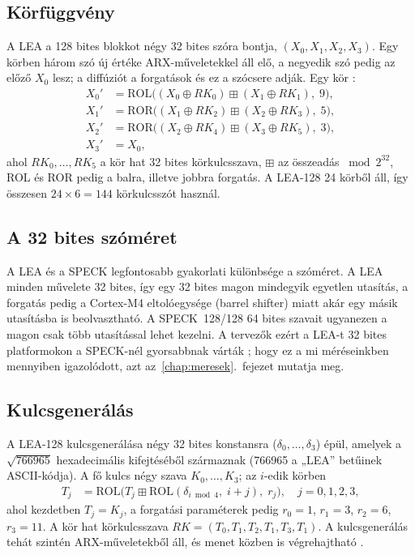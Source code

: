 \documentclass[a4paper,12pt]{report}
\theoremstyle{definition}
\theoremstyle{remark}
\begin{document}
\subsection{Körfüggvény}\label{sec:lea_kor}

A LEA a 128 bites blokkot négy 32 bites szóra bontja, $(X_0, X_1, X_2, X_3)$. Egy körben három szó új értéke ARX-műveletekkel áll elő, a negyedik szó pedig az előző $X_0$ lesz; a diffúziót a forgatások és ez a szócsere adják. Egy kör \cite{Hong2013}:
\begin{align}
X_0' &= \text{ROL}\big((X_0 \oplus RK_0) \mathbin{\boxplus} (X_1 \oplus RK_1),\; 9\big), \\
X_1' &= \text{ROR}\big((X_1 \oplus RK_2) \mathbin{\boxplus} (X_2 \oplus RK_3),\; 5\big), \\
X_2' &= \text{ROR}\big((X_2 \oplus RK_4) \mathbin{\boxplus} (X_3 \oplus RK_5),\; 3\big), \\
X_3' &= X_0,
\end{align}
ahol $RK_0, \ldots, RK_5$ a kör hat 32 bites körkulcsszava, $\boxplus$ az összeadás $\bmod 2^{32}$, ROL és ROR pedig a balra, illetve jobbra forgatás. A LEA-128 24 körből áll, így összesen $24 \times 6 = 144$ körkulcsszót használ.

\subsection{A 32 bites szóméret}

A LEA és a SPECK legfontosabb gyakorlati különbsége a szóméret. A LEA minden művelete 32 bites, így egy 32 bites magon mindegyik egyetlen utasítás, a forgatás pedig a Cortex-M4 eltolóegysége (barrel shifter) miatt akár egy másik utasításba is beolvasztható. A SPECK~128/128 64 bites szavait ugyanezen a magon csak több utasítással lehet kezelni. A tervezők ezért a LEA-t 32 bites platformokon a SPECK-nél gyorsabbnak várták \cite{Hong2013}; hogy ez a mi méréseinkben mennyiben igazolódott, azt az~\ref{chap:meresek}.~fejezet mutatja meg.

\subsection{Kulcsgenerálás}\label{sec:lea_kulcs}

A LEA-128 kulcsgenerálása négy 32 bites konstansra ($\delta_0, \ldots, \delta_3$) épül, amelyek a $\sqrt{766965}$ hexadecimális kifejtéséből származnak (766965 a „LEA'' betűinek ASCII-kódja). A fő kulcs négy szava $K_0, \ldots, K_3$; az $i$-edik körben
\begin{align}
T_j &= \text{ROL}\big(T_j \mathbin{\boxplus} \text{ROL}(\delta_{i \bmod 4},\; i+j),\; r_j\big), \quad j = 0,1,2,3,
\end{align}
ahol kezdetben $T_j = K_j$, a forgatási paraméterek pedig $r_0 = 1$, $r_1 = 3$, $r_2 = 6$, $r_3 = 11$. A kör hat körkulcsszava $RK = (T_0, T_1, T_2, T_1, T_3, T_1)$. A kulcsgenerálás tehát szintén ARX-műveletekből áll, és menet közben is végrehajtható \cite{Hong2013}.
\end{document}
